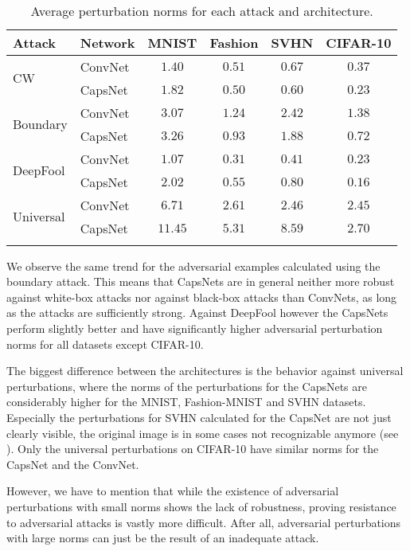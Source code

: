 \begin{table}
	\centering\
	\begin{tabular}{llcccc}
		\toprule
		Attack & Network       & MNIST & Fashion & SVHN & CIFAR-10  \\
		\midrule
		\multirow{2}{*}{CW} & ConvNet & {$1.40$} & $0.51$ & $0.67$ & $0.37$ \\
		& CapsNet            & $1.82$ & {$0.50$} & {$0.60$} & {$0.23$} \\
		\midrule
		\multirow{2}{*}{Boundary} & ConvNet & {$3.07$} & $1.24$ & $2.42$ & $1.38$ \\
		& CapsNet            & $3.26$ & {$0.93$} & {$1.88$} & {$0.72$} \\
		\midrule
		\multirow{2}{*}{DeepFool} & ConvNet & {$1.07$} & {$0.31$} & {$0.41$} & $0.23$ \\
		& CapsNet           & $2.02$ & $0.55$ & $0.80$ & {$0.16$} \\
		\midrule
		\multirow{2}{*}{Universal} & ConvNet & {$6.71$} & {$2.61$} & {$2.46$} & {$2.45$} \\
		& CapsNet           & $11.45$ & $5.31$ & $8.59$ & $2.70$ \\
		\bottomrule\\
	\end{tabular}
	\caption[Average perturbation norms]{Average perturbation norms for each attack and architecture.}
	\label{tab:norms}
\end{table}

We observe the same trend for the adversarial examples calculated using the boundary attack.
This means that CapsNets are in general neither more robust against white-box attacks nor against black-box attacks than ConvNets, as long as the attacks are sufficiently strong.
Against DeepFool however the CapsNets perform slightly better and have significantly higher adversarial perturbation norms for all datasets except CIFAR-10.

The biggest difference between the architectures is the behavior against universal perturbations, where the norms of the perturbations for the CapsNets are considerably higher for the MNIST, Fashion-MNIST and SVHN datasets. Especially the perturbations for SVHN calculated for the CapsNet are not just clearly visible, the original image is in some cases not recognizable anymore (see ).
Only the universal perturbations on CIFAR-10 have similar norms for the CapsNet and the ConvNet.

However, we have to mention that while the existence of adversarial perturbations with small norms shows the lack of robustness, proving resistance to adversarial attacks is vastly more difficult.
After all, adversarial perturbations with large norms can just be the result of an inadequate attack.

